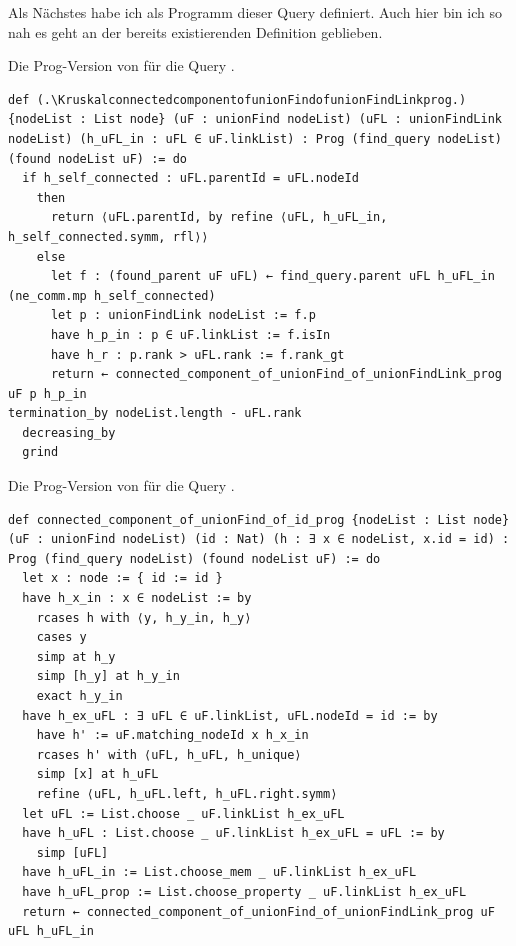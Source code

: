 Als Nächstes habe ich \KruskalconnectedcomponentofunionFindofid als Programm dieser Query definiert.
Auch hier bin ich so nah es geht an der bereits existierenden Definition geblieben.

\begin{definition}[\KruskalconnectedcomponentofunionFindofunionFindLinkprog]
  Die Prog-Version von \KruskalconnectedcomponentofunionFindofunionFindLink für die Query \Kruskalfindquery.
\end{definition}
\begin{lstlisting}
def (.\KruskalconnectedcomponentofunionFindofunionFindLinkprog.) {nodeList : List node} (uF : unionFind nodeList) (uFL : unionFindLink nodeList) (h_uFL_in : uFL ∈ uF.linkList) : Prog (find_query nodeList) (found nodeList uF) := do
  if h_self_connected : uFL.parentId = uFL.nodeId
    then
      return ⟨uFL.parentId, by refine ⟨uFL, h_uFL_in, h_self_connected.symm, rfl⟩⟩
    else
      let f : (found_parent uF uFL) ← find_query.parent uFL h_uFL_in (ne_comm.mp h_self_connected)
      let p : unionFindLink nodeList := f.p
      have h_p_in : p ∈ uF.linkList := f.isIn
      have h_r : p.rank > uFL.rank := f.rank_gt
      return ← connected_component_of_unionFind_of_unionFindLink_prog uF p h_p_in
termination_by nodeList.length - uFL.rank
  decreasing_by
  grind
\end{lstlisting}

\begin{definition}[\KruskalconnectedcomponentofunionFindofidprog]
  Die Prog-Version von \KruskalconnectedcomponentofunionFindofid für die Query \Kruskalfindquery.
\end{definition}
\begin{lstlisting}
def connected_component_of_unionFind_of_id_prog {nodeList : List node} (uF : unionFind nodeList) (id : Nat) (h : ∃ x ∈ nodeList, x.id = id) : Prog (find_query nodeList) (found nodeList uF) := do
  let x : node := { id := id }
  have h_x_in : x ∈ nodeList := by
    rcases h with ⟨y, h_y_in, h_y⟩
    cases y
    simp at h_y
    simp [h_y] at h_y_in
    exact h_y_in
  have h_ex_uFL : ∃ uFL ∈ uF.linkList, uFL.nodeId = id := by
    have h' := uF.matching_nodeId x h_x_in
    rcases h' with ⟨uFL, h_uFL, h_unique⟩
    simp [x] at h_uFL
    refine ⟨uFL, h_uFL.left, h_uFL.right.symm⟩
  let uFL := List.choose _ uF.linkList h_ex_uFL
  have h_uFL : List.choose _ uF.linkList h_ex_uFL = uFL := by
    simp [uFL]
  have h_uFL_in := List.choose_mem _ uF.linkList h_ex_uFL
  have h_uFL_prop := List.choose_property _ uF.linkList h_ex_uFL
  return ← connected_component_of_unionFind_of_unionFindLink_prog uF uFL h_uFL_in
\end{lstlisting}

